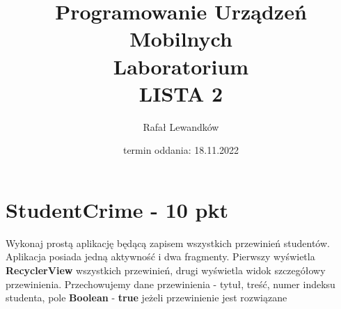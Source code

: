 \documentclass[a4paper]{article}
\title{Programowanie Urządzeń Mobilnych \\ Laboratorium \\ \textbf{LISTA 2}}
\author{Rafał Lewandków}
\date{termin oddania: 18.11.2022}
\begin{document}
\maketitle
    

\section*{StudentCrime - 10 pkt}

Wykonaj prostą aplikację będącą zapisem wszystkich przewinień studentów. Aplikacja posiada jedną aktywność i dwa fragmenty. Pierwszy wyświetla \textbf{RecyclerView} wszystkich przewinień, drugi wyświetla widok szczegółowy przewinienia. Przechowujemy dane przewinienia - tytuł, treść, numer indeksu studenta, pole \textbf{Boolean} - \textbf{true} jeżeli przewinienie jest rozwiązane
\end{document}
